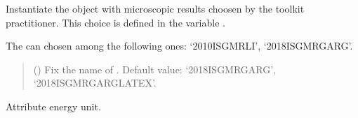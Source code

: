 \documentclass[letterpaper,10pt,english]{sphinxmanual}
\begin{document}
\begin{fulllineitems}
\label{\detokenize{source/api/setup_nuc_isgmr_exp:nucleardatapy.setup_nuc_isgmr_exp.SetupNucISGMRExp}}
\pysigstartsignatures
\pysiglinewithargsret
{}
{}
{}
\pysigstopsignatures
\sphinxAtStartPar
Instantiate the object with microscopic results choosen    by the toolkit practitioner.
This choice is defined in the variable .

\sphinxAtStartPar
The  can chosen among the following ones:    ‘2010\sphinxhyphen{}ISGMR\sphinxhyphen{}LI’, ‘2018\sphinxhyphen{}ISGMR\sphinxhyphen{}GARG’.
\begin{quote}\begin{description}
\sphinxAtStartPar
{} (\sphinxstyleliteralemphasis{\sphinxupquote{, }}) \textendash{} Fix the name of . Default value: ‘2018\sphinxhyphen{}ISGMR\sphinxhyphen{}GARG’, ‘2018\sphinxhyphen{}ISGMR\sphinxhyphen{}GARG\sphinxhyphen{}LATEX’.

\end{description}\end{quote}

\sphinxAtStartPar
{}

\begin{fulllineitems}
\label{\detokenize{source/api/setup_nuc_isgmr_exp:nucleardatapy.setup_nuc_isgmr_exp.SetupNucISGMRExp.E_unit}}
\pysigstartsignatures
\pysigline
{}
\pysigstopsignatures
\sphinxAtStartPar
Attribute energy unit.

\end{fulllineitems}



\end{fulllineitems}
\end{document}
